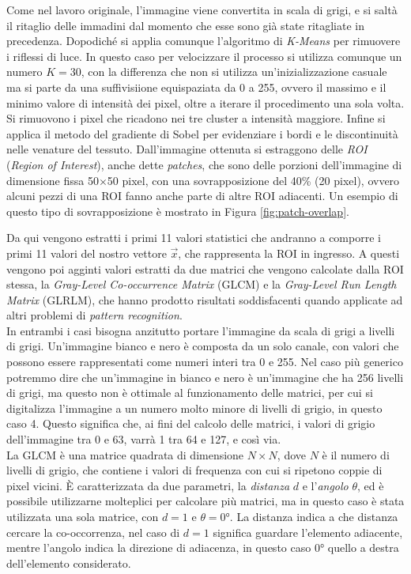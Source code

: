 Come nel lavoro originale, l'immagine viene convertita in scala di grigi,
e si saltà il ritaglio delle immadini dal momento che esse sono già state
ritagliate in precedenza.
Dopodiché si applia comunque l'algoritmo di {\it K-Means} per rimuovere
i riflessi di luce.
In questo caso per velocizzare il processo si utilizza comunque un numero
$K=30$, con la differenza che non si utilizza un'inizializzazione
casuale ma si parte da una suffivisiione equispaziata da 0 a 255, ovvero
il massimo e il minimo valore di intensità dei pixel, oltre a iterare
il procedimento una sola volta.
Si rimuovono i pixel che ricadono nei tre cluster a intensità maggiore.
Infine si applica il metodo del gradiente di Sobel per evidenziare i bordi
e le discontinuità nelle venature del tessuto.
Dall'immagine ottenuta si estraggono delle {\it ROI} ({\it Region of Interest}),
anche dette {\it patches}, che sono delle porzioni dell'immagine di dimensione
fissa 50$\times$50 pixel, con una sovrapposizione del 40\% (20 pixel), ovvero
alcuni pezzi di una ROI fanno anche parte di altre ROI adiacenti.
Un esempio di questo tipo di sovrapposizione è mostrato in Figura \ref{fig:patch-overlap}.


Da qui vengono estratti i primi 11 valori statistici che andranno a comporre
i primi 11 valori del nostro vettore $\vec{x}$, che rappresenta la ROI in
ingresso.
A questi vengono poi agginti valori estratti da due matrici che vengono
calcolate dalla ROI stessa, la {\it Gray-Level Co-occurrence Matrix} (GLCM)
e la {\it Gray-Level Run Length Matrix} (GLRLM), che hanno prodotto
risultati soddisfacenti quando applicate ad altri problemi di
{\it pattern recognition}.\cite{GLCM}\\
In entrambi i casi bisogna anzitutto portare l'immagine da scala di grigi
a livelli di grigi.
Un'immagine bianco e nero è composta da un solo canale, con valori che possono
essere rappresentati come numeri interi tra 0 e 255.
Nel caso più generico potremmo dire che un'immagine in bianco e nero
è un'immagine che ha 256 livelli di grigi, ma questo non è ottimale al
funzionamento delle matrici, per cui si digitalizza l'immagine a un numero molto
minore di livelli di grigio, in questo caso 4.
Questo significa che, ai fini del calcolo delle matrici, i valori di grigio
dell'immagine tra 0 e 63, varrà 1 tra 64 e 127, e così via.\\
La GLCM è una matrice quadrata di dimensione $N \times N$, dove $N$ è il
numero di livelli di grigio, che contiene i valori di frequenza con cui
si ripetono coppie di pixel vicini.
È caratterizzata da due parametri, la {\it distanza} $d$ e l'{\it angolo} $\theta$,
ed è possibile utilizzarne molteplici per calcolare più matrici,
ma in questo caso è stata utilizzata una sola matrice, con $d=1$ e $\theta=0$°.
La distanza indica a che distanza cercare la co-occorrenza, nel caso di $d=1$
significa guardare l'elemento adiacente, mentre l'angolo indica la direzione
di adiacenza, in questo caso $0$° quello a destra dell'elemento considerato.

